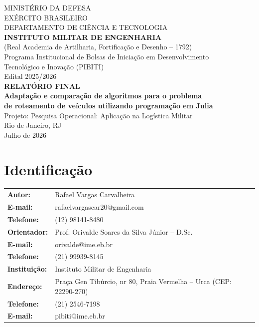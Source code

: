 \documentclass[a4paper,12pt]{article}
\begin{document}
\begin{center}
    MINISTÉRIO DA DEFESA\\
    EXÉRCITO BRASILEIRO\\
    DEPARTAMENTO DE CIÊNCIA E TECNOLOGIA\\
    \textbf{INSTITUTO MILITAR DE ENGENHARIA}\\
    (Real Academia de Artilharia, Fortificação e Desenho -- 1792)\\[1.5cm]

    Programa Institucional de Bolsas de Iniciação em Desenvolvimento\\
    Tecnológico e Inovação (PIBITI)\\[0.4cm]
    Edital 2025/2026\\[0.8cm]

    \textbf{\large RELATÓRIO FINAL}\\[1.5cm]

    \textbf{\large Adaptação e comparação de algoritmos para o problema\\
    de roteamento de veículos utilizando programação em Julia}\\[1cm]

    Projeto: Pesquisa Operacional: Aplicação na Logística Militar\\[2cm]

    Rio de Janeiro, RJ\\
    Julho de 2026
\end{center}

\newpage

\section*{Identificação}

\begin{table}[H]
    \begin{tabular}{@{}p{4.5cm}p{10cm}@{}}
        \textbf{Autor:} & Rafael Vargas Carvalheira \\
        \textbf{E-mail:} & rafaelvargascar20@gmail.com \\
        \textbf{Telefone:} & (12) 98141-8480 \\[0.3cm]
        \textbf{Orientador:} & Prof. Orivalde Soares da Silva Júnior -- D.Sc. \\
        \textbf{E-mail:} & orivalde@ime.eb.br \\
        \textbf{Telefone:} & (21) 99939-8145 \\[0.3cm]
        \textbf{Instituição:} & Instituto Militar de Engenharia \\
        \textbf{Endereço:} & Praça Gen Tibúrcio, nr 80, Praia Vermelha -- Urca
                             (CEP: 22290-270) \\
        \textbf{Telefone:} & (21) 2546-7198 \\
        \textbf{E-mail:} & pibiti@ime.eb.br \\
    \end{tabular}
\end{table}
\end{document}
